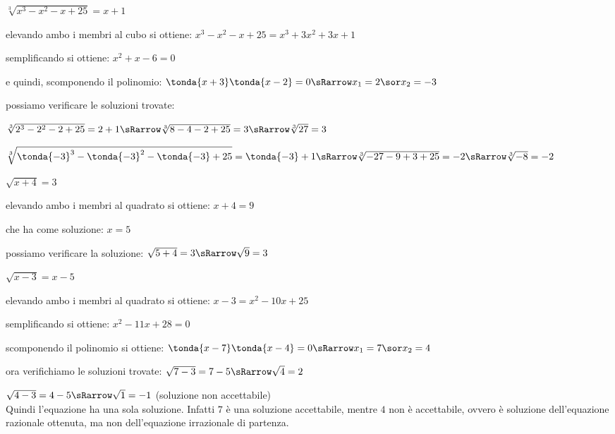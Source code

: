 \begin{esempio}
 \(\sqrt[3]{x^3-x^2-x+25} = x+1\)

\vspace{4pt}
 
 elevando ambo i membri al cubo si ottiene: \(x^3-x^2-x+25 = x^3+3x^2+3x+1\)
 
 semplificando si ottiene: 
 \(x^2+x-6=0\) 
 
 e quindi, scomponendo il polinomio:
 \(\tonda{x+3}\tonda{x-2}=0 \sRarrow x_1 = 2 \sor x_2=-3\)
 
 possiamo verificare le soluzioni trovate:
 
 \(\sqrt[3]{2^3-2^2-2+25} = 2+1 \sRarrow \sqrt[3]{8-4-2+25} = 3 \sRarrow 
 \sqrt[3]{27} = 3\)
 
 \(\sqrt[3]{\tonda{-3}^3-\tonda{-3}^2-\tonda{-3}+25} = \tonda{-3}+1 \sRarrow 
 \sqrt[3]{-27-9+3+25} = -2 \sRarrow \sqrt[3]{-8} = -2\)
\end{esempio}

\begin{esempio}
 \(\sqrt{x+4} = 3\)

\vspace{4pt}
  
 elevando ambo i membri al quadrato si ottiene: \(x+4 = 9\)
 
 che ha come soluzione: \(x=5\)
 
 possiamo verificare la soluzione:
 \(\sqrt{5+4} = 3 \sRarrow \sqrt{9} = 3\)
\end{esempio}

\begin{esempio}
 \(\sqrt{x-3} = x-5\)
 
\vspace{4pt}
 
 elevando ambo i membri al quadrato si ottiene: \(x-3 = x^2-10x+25\)
 
 semplificando si ottiene: \(x^2-11x+28=0\)
 
 scomponendo il polinomio si ottiene:
 \(\tonda{x-7}\tonda{x-4}=0 \sRarrow x_1 = 7 \sor x_2 = 4\)
 
 ora verifichiamo le soluzioni trovate:
 \(\sqrt{7-3} = 7-5 \sRarrow \sqrt{4} = 2\)
 
 \(\sqrt{4-3} = 4-5 \sRarrow \sqrt{1} = -1\) (soluzione non accettabile)\\
 
 Quindi l'equazione ha una sola soluzione. Infatti \(7\) è una soluzione accettabile,
 mentre \(4\) non è accettabile, ovvero è soluzione dell'equazione razionale ottenuta,
 ma non dell'equazione irrazionale di partenza.
\end{esempio}

